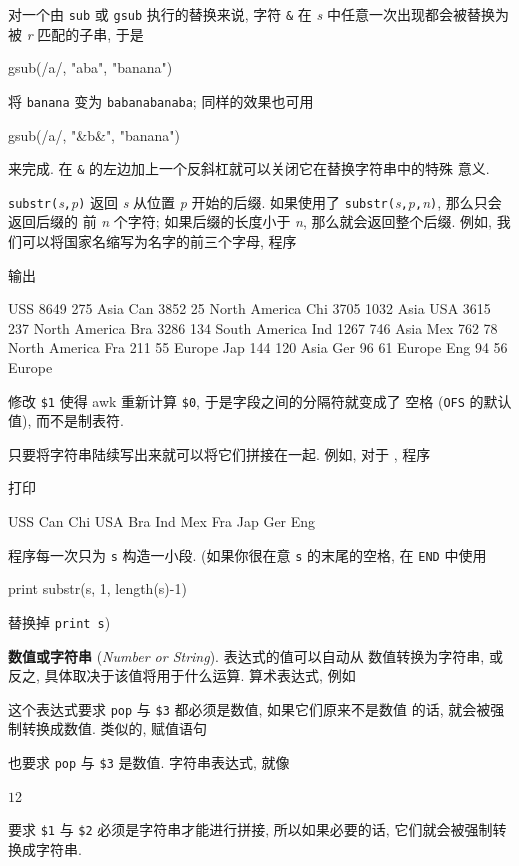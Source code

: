 对一个由 \verb'sub' 或 \verb'gsub' 执行的替换来说, 字符 \verb'&' 在
\textit{s} 中任意一次出现都会被替换为被 \textit{r} 匹配的子串, 于是
\begin{awkcode}
    gsub(/a/, "aba", "banana")
\end{awkcode}
将 \verb'banana' 变为 \verb'babanabanaba'; 同样的效果也可用
\begin{awkcode}
    gsub(/a/, "&b&", "banana")
\end{awkcode}
来完成. 在 \verb'&' 的左边加上一个反斜杠就可以关闭它在替换字符串中的特殊
意义.

\verb'substr('\textit{s}\verb','\textit{p}\verb')'
返回 \textit{s} 从位置 \textit{p} 开始的后缀. 如果使用了
\verb'substr('\textit{s}\verb','\textit{p}\verb','\textit{n}\verb')',
那么只会返回后缀的
前 \textit{n} 个字符; 如果后缀的长度小于 \textit{n}, 那么就会返回整个后缀.
例如, 我们可以将国家名缩写为名字的前三个字母, 程序
输出
\begin{awkcode}
    USS 8649 275 Asia
    Can 3852 25 North America
    Chi 3705 1032 Asia
    USA 3615 237 North America
    Bra 3286 134 South America
    Ind 1267 746 Asia
    Mex 762 78 North America
    Fra 211 55 Europe
    Jap 144 120 Asia
    Ger 96 61 Europe
    Eng 94 56 Europe
\end{awkcode}
修改 \verb'$1' 使得 awk 重新计算 \verb'$0', 于是字段之间的分隔符就变成了
空格 (\verb'OFS' 的默认值), 而不是制表符.

只要将字符串陆续写出来就可以将它们拼接在一起. 例如, 对于
, 程序
打印
\begin{awkcode}
    USS Can Chi USA Bra Ind Mex Fra Jap Ger Eng
\end{awkcode}
程序每一次只为 \verb's' 构造一小段. (如果你很在意 \verb's' 的末尾的空格,
在 \verb'END' 中使用
\begin{awkcode}
    print substr(s, 1, length(s)-1)
\end{awkcode}
替换掉 \verb'print s')

\textbf{数值或字符串} (\emph{Number or String}). 表达式的值可以自动从
数值转换为字符串, 或反之, 具体取决于该值将用于什么运算. 算术表达式, 例如
这个表达式要求 \verb'pop' 与 \verb'$3' 都必须是数值, 如果它们原来不是数值
的话, 就会被强制转换成数值. 类似的, 赋值语句
也要求 \verb'pop' 与 \verb'$3' 是数值. 字符串表达式, 就像
\begin{awkcode}
    $1 $2
\end{awkcode}
要求 \verb'$1' 与 \verb'$2' 必须是字符串才能进行拼接, 所以如果必要的话,
它们就会被强制转换成字符串.

